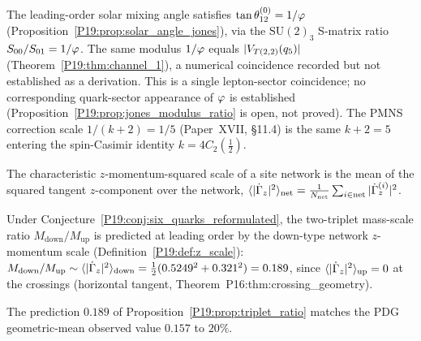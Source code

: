 \begin{remark}
\label{P19:rem:cross_sector_phi}
The leading-order solar mixing angle satisfies
$\tan\theta_{12}^{(0)}=1/\varphi$ (Proposition~\ref{P19:prop:solar_angle_jones}),
via the $\mathrm{SU}(2)_3$ S-matrix ratio $S_{00}/S_{01}=1/\varphi$. The
same modulus $1/\varphi$ equals $|V_{T(2,2)}(q_5)|$
(Theorem~\ref{P19:thm:channel_1}), a numerical coincidence recorded
but not established as a derivation. This is a single lepton-sector
coincidence; no corresponding quark-sector appearance of $\varphi$ is
established (Proposition~\ref{P19:prop:jones_modulus_ratio} is open,
not proved). The PMNS correction scale $1/(k+2)=1/5$
(Paper~XVII, \S11.4) is the same $k+2=5$ entering the spin-Casimir
identity $k=4C_2(\tfrac12)$.
\end{remark}


\begin{definition}
\label{P19:def:z_scale}
The characteristic $z$-momentum-squared scale of a site network is the
mean of the squared tangent $z$-component over the network,
$\langle|\dot\Gamma_z|^2\rangle_{\mathrm{net}}=
\tfrac1{N_{\mathrm{net}}}\sum_{i\in\mathrm{net}}|\dot\Gamma_z^{(i)}|^2$.
\end{definition}

\begin{proposition}
\label{P19:prop:triplet_ratio}
Under Conjecture~\ref{P19:conj:six_quarks_reformulated}, the two-triplet
mass-scale ratio $M_{\mathrm{down}}/M_{\mathrm{up}}$ is predicted at
leading order by the down-type network $z$-momentum scale
(Definition~\ref{P19:def:z_scale}):
$M_{\mathrm{down}}/M_{\mathrm{up}}\sim
\langle|\dot\Gamma_z|^2\rangle_{\mathrm{down}}=
\tfrac12(0.5249^2+0.321^2)=0.189$, since
$\langle|\dot\Gamma_z|^2\rangle_{\mathrm{up}}=0$ at the crossings
(horizontal tangent, Theorem~P16:thm:crossing\_geometry).
\end{proposition}

\begin{corollary}
\label{P19:cor:triplet_agreement}
The prediction $0.189$ of Proposition~\ref{P19:prop:triplet_ratio}
matches the PDG geometric-mean observed value $0.157$ to $20\%$.
\end{corollary}

